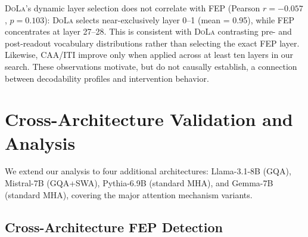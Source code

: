 \documentclass[11pt]{article}
\newcommand{\iti}{\textsc{ITI}}
\newcommand{\dola}{\textsc{DoLa}}
\newcommand{\caa}{\textsc{CAA}}
\begin{document}
\dola{}'s dynamic layer selection does not correlate with FEP (Pearson $r = -0.057$, $p = 0.103$): \dola{} selects near-exclusively layer 0--1 (mean = 0.95), while FEP concentrates at layer 27--28. This is consistent with \dola{} contrasting pre- and post-readout vocabulary distributions rather than selecting the exact FEP layer. Likewise, \caa{}/\iti{} improve only when applied across at least ten layers in our search. These observations motivate, but do not causally establish, a connection between decodability profiles and intervention behavior.

\section{Cross-Architecture Validation and Analysis}
\label{sec:cross_arch}

We extend our analysis to four additional architectures: Llama-3.1-8B (GQA), Mistral-7B (GQA+SWA), Pythia-6.9B (standard MHA), and Gemma-7B (standard MHA), covering the major attention mechanism variants.

\subsection{Cross-Architecture FEP Detection}

\begin{table}[t]
\centering
\small
{}
\caption{Cross-architecture and cross-scale FEP detection (817 samples). FEP Depth = Mean FEP / total layers. All tested models show mean answer-token decodability after 80\% depth, with substantial variation in strict final-layer FEP.}
\label{tab:cross_fep}
\end{table}
\end{document}
